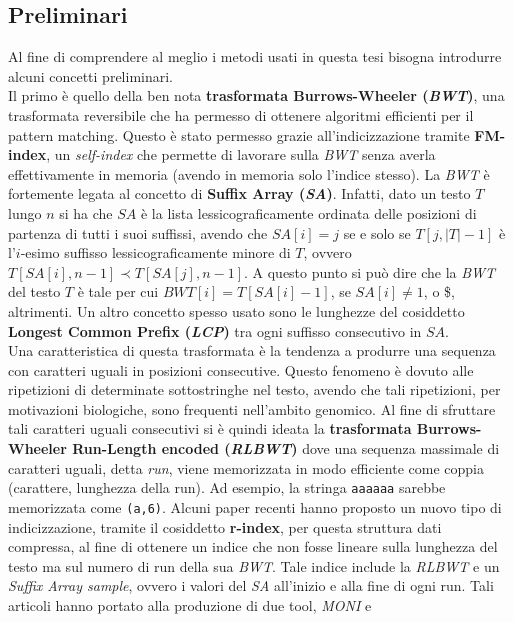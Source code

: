 \documentclass[a4paper,11pt, oneside]{article}
\begin{document}
\subsection*{Preliminari}
Al fine di comprendere al meglio i metodi usati in questa tesi bisogna
introdurre alcuni concetti preliminari.\\
Il primo è quello della ben nota \textbf{trasformata Burrows-Wheeler
  (\textit{BWT})}, una trasformata reversibile che ha permesso di ottenere
algoritmi efficienti per il pattern matching. Questo è stato permesso grazie
all'indicizzazione tramite 
\textbf{FM-index}, un \textit{self-index} che permette di lavorare sulla
\textit{BWT} senza averla effettivamente in memoria (avendo in memoria solo
l'indice stesso). La \textit{BWT} è fortemente legata al concetto di
\textbf{Suffix Array (\textit{SA})}. Infatti, dato un testo $T$ lungo $n$ si ha
che $SA$ è la lista lessicograficamente ordinata delle posizioni di partenza di
tutti i suoi suffissi, avendo che $SA[i]=j$ se e solo se $T[j, |T|-1]$ è
l'$i$-esimo 
suffisso lessicograficamente minore di $T$, ovvero $T[SA[i],n-1] \prec 
T[SA[j],n-1]$. A questo punto si può dire che la \textit{BWT} del testo $T$ è
tale per cui $BWT[i]=T[SA[i]-1]$, se $SA[i]\neq 1$, o \$, altrimenti. Un altro
concetto spesso usato 
sono le lunghezze del cosiddetto \textbf{Longest Common Prefix (\textit{LCP})}
tra ogni suffisso consecutivo in $SA$.\\
Una caratteristica di questa trasformata è la tendenza a
produrre una sequenza con caratteri uguali in posizioni
consecutive. Questo fenomeno è dovuto alle ripetizioni di determinate
sottostringhe nel testo, avendo che tali ripetizioni, per motivazioni
biologiche, sono frequenti nell'ambito genomico. Al fine di sfruttare tali
caratteri uguali consecutivi si 
è quindi ideata la \textbf{trasformata Burrows-Wheeler Run-Length encoded
  (\textit{RLBWT})} dove una sequenza massimale di caratteri uguali, detta
\textit{run}, viene memorizzata in modo efficiente come coppia (carattere,
lunghezza della run). Ad esempio, la stringa \texttt{aaaaaa} sarebbe memorizzata
come \texttt{(a,6)}. Alcuni paper recenti hanno proposto un nuovo tipo di
indicizzazione, tramite il cosiddetto \textbf{r-index}, per questa struttura
dati compressa, al fine di ottenere un indice che non fosse lineare sulla
lunghezza del testo ma sul numero di run della sua \textit{BWT}.
Tale indice include la \textit{RLBWT} e un \textit{Suffix Array sample},
ovvero i valori del \textit{SA} all’inizio e alla fine di ogni run. Tali
articoli hanno portato alla produzione di due tool, \textit{MONI} e 
\end{document}

